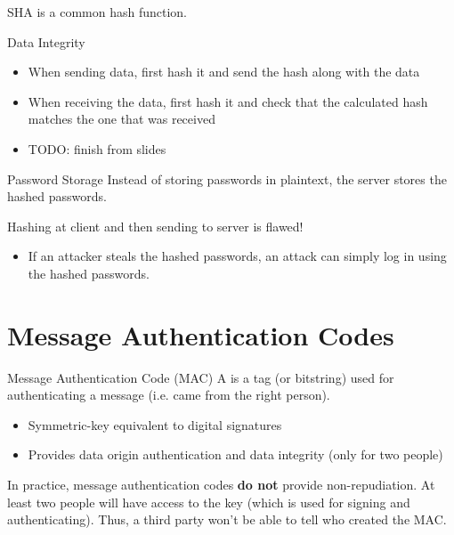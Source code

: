 \begin{dfnbox}{SHA}{}
     is a common hash function.
\end{dfnbox}

\begin{exbox}{Data Integrity}{}
    \begin{itemize}
        \item When sending data, first hash it and send the hash along with the data
        \item When receiving the data, first hash it and check that the calculated hash matches the one that was received
        \item TODO: finish from slides
    \end{itemize}
\end{exbox}

\begin{exbox}{Password Storage}{}
    Instead of storing passwords in plaintext, the server stores the hashed passwords.

    Hashing at client and then sending to server is flawed!
    \begin{itemize}
        \item If an attacker steals the hashed passwords, an attack can simply log in using the hashed passwords.
    \end{itemize}
\end{exbox}

\section{Message Authentication Codes}

\begin{dfnbox}{Message Authentication Code (MAC)}{}
    A  is a tag (or bitstring) used for authenticating a message (i.e. came from the right person).
\end{dfnbox}

\begin{itemize}[noitemsep]
    \item Symmetric-key equivalent to digital signatures
    \item Provides data origin authentication and data integrity (only for two people)
\end{itemize}

In practice, message authentication codes \textbf{do not} provide non-repudiation. At least two people will have access to the key (which is used for signing and authenticating). Thus, a third party won't be able to tell who created the MAC.

